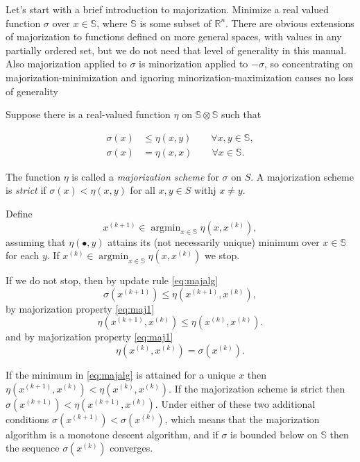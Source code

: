 \documentclass[
  12pt,
]{article}
\begin{document}
Let's start with a brief introduction to majorization. Minimize a real
valued function \(\sigma\) over \(x\in\mathbb{S}\), where \(\mathbb{S}\) is
some subset of \(\mathbb{R}^n\). There are obvious extensions of
majorization to functions defined on more general spaces, with values in
any partially ordered set, but we do not need that level of generality
in this manual. Also majorization applied to \(\sigma\) is minorization
applied to \(-\sigma\), so concentrating on majorization-minimization and
ignoring minorization-maximization causes no loss of generality

Suppose there is a real-valued function \(\eta\) on
\(\mathbb{S}\otimes\mathbb{S}\) such that

\begin{align}
\sigma(x)&\leq\eta(x,y)\qquad\forall x,y\in\mathbb{S},\label{eq:maj1}\\
\sigma(x)&=\eta(x,x)\qquad\forall x\in\mathbb{S}.\label{eq:maj2}
\end{align}

The function \(\eta\) is called a \emph{majorization scheme} for \(\sigma\) on
\(S\). A majorization scheme is \emph{strict} if \(\sigma(x)<\eta(x,y)\) for all
\(x,y\in S\) withj \(x\not=y\).

Define \begin{equation}
x^{(k+1)}\in\mathop{\text{argmin}}_{x\in\mathbb{S}}\eta(x,x^{(k)}),
\label{eq:majalg}
\end{equation} assuming that \(\eta(\bullet,y)\) attains its (not
necessarily unique) minimum over \(x\in\mathbb{S}\) for each \(y\). If
\(x^{(k)}\in\mathop{\text{argmin}}_{x\in\mathbb{S}}\eta(x,x^{(k)})\) we
stop.

If we do not stop, then by update rule \eqref{eq:majalg} \begin{equation}
\sigma(x^{(k+1)})\leq\eta(x^{(k+1)},x^{(k)}),
\end{equation} by majorization property \eqref{eq:maj1} \begin{equation}
\eta(x^{(k+1)},x^{(k)})\leq\eta(x^{(k)},x^{(k)}).
\end{equation} and by majorization property \eqref{eq:maj1}
\begin{equation}
\eta(x^{(k)},x^{(k)})=\sigma(x^{(k)}).
\end{equation}

If the minimum in \eqref{eq:majalg} is attained for a unique \(x\) then
\(\eta(x^{(k+1)},x^{(k)})<\eta(x^{(k)},x^{(k)})\). If the majorization
scheme is strict then \(\sigma(x^{(k+1)})<\eta(x^{(k+1)},x^{(k)})\). Under
either of these two additional conditions
\(\sigma(x^{(k+1)})<\sigma(x^{(k)})\), which means that the majorization
algorithm is a monotone descent algorithm, and if \(\sigma\) is bounded
below on \(\mathbb{S}\) then the sequence \(\sigma(x^{(k)})\) converges.
\end{document}
